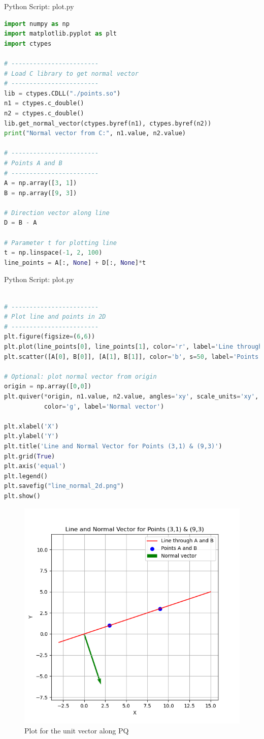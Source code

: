 \documentclass{beamer}
\numberwithin{equation}{section}
\begin{document}
\begin{frame}[fragile]{Python Script: plot.py}
\begin{lstlisting}[language=Python]
import numpy as np
import matplotlib.pyplot as plt
import ctypes

# ------------------------
# Load C library to get normal vector
# ------------------------
lib = ctypes.CDLL("./points.so")
n1 = ctypes.c_double()
n2 = ctypes.c_double()
lib.get_normal_vector(ctypes.byref(n1), ctypes.byref(n2))
print("Normal vector from C:", n1.value, n2.value)

# ------------------------
# Points A and B
# ------------------------
A = np.array([3, 1])
B = np.array([9, 3])

# Direction vector along line
D = B - A

# Parameter t for plotting line
t = np.linspace(-1, 2, 100)
line_points = A[:, None] + D[:, None]*t
\end{lstlisting}
\end{frame}
\begin{frame}[fragile]{Python Script: plot.py}
\begin{lstlisting}[language=Python]

# ------------------------
# Plot line and points in 2D
# ------------------------
plt.figure(figsize=(6,6))
plt.plot(line_points[0], line_points[1], color='r', label='Line through A and B')
plt.scatter([A[0], B[0]], [A[1], B[1]], color='b', s=50, label='Points A and B')

# Optional: plot normal vector from origin
origin = np.array([0,0])
plt.quiver(*origin, n1.value, n2.value, angles='xy', scale_units='xy', scale=1,
           color='g', label='Normal vector')

plt.xlabel('X')
plt.ylabel('Y')
plt.title('Line and Normal Vector for Points (3,1) & (9,3)')
plt.grid(True)
plt.axis('equal')
plt.legend()
plt.savefig("line_normal_2d.png")
plt.show()

\end{lstlisting}
\end{frame}

\begin{figure}
     \centering
     \includegraphics[width=0.7\columnwidth]{figs/Figure_1.png}
     \caption{Plot for the unit vector along PQ}
     \label{fig2}
 \end{figure}
\end{document}

